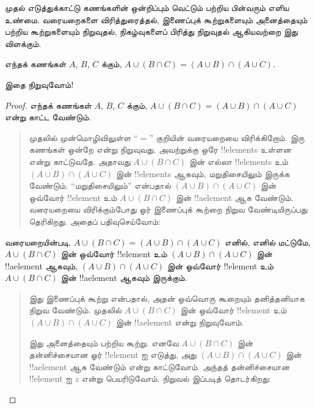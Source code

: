 \documentclass[../../../include/open-logic-section]{subfiles}
\begin{document}


முதல் எடுத்துக்காட்டு கணங்களின் ஒன்றிப்பும் வெட்டும் பற்றிய
பின்வரும் எளிய உண்மை. வரையறைகளை விரித்துரைத்தல்,
இணைப்புக் கூற்றுகளையும் அனைத்தையும் பற்றிய கூற்றுகளையும்
நிறுவுதல், நிகழ்வுகளைப் பிரித்து நிறுவுதல் ஆகியவற்றை
இது விளக்கும்.

\begin{prop}
எந்தக் கணங்கள் $A$, $B$, $C$ க்கும்,
$A \cup (B \cap C) = (A \cup B) \cap (A \cup C)$.
\end{prop}

இதை நிறுவுவோம்!{}

\begin{proof}
எந்தக் கணங்கள் $A$, $B$, $C$ க்கும்,
$A \cup (B \cap C) = (A \cup B) \cap (A \cup C)$
என்று காட்ட வேண்டும்.
\begin{quote}
முதலில் முன்மொழிவிலுள்ள ``$=$'' குறியின் வரையறையை
விரிக்கிறோம். இரு கணங்கள் ஒன்றே என்று நிறுவுவது,
அவற்றுக்கு ஒரே !!{element}s உள்ளன என்று காட்டுவதே.
அதாவது $A \cup (B \cap C)$ இன் எல்லா
!!{element}s உம் $(A \cup B) \cap (A \cup C)$
இன் !!{element}s ஆகவும், மறுதிசையிலும் இருக்க வேண்டும்.
``மறுதிசையிலும்'' என்பதால் $(A \cup B) \cap (A \cup C)$
இன் ஒவ்வோர் !!{element} உம் $A \cup (B \cap C)$
இன் !!a{element} ஆக வேண்டும். வரையறையை விரிக்கும்போது
ஓர் இணைப்புக் கூற்றை நிறுவ வேண்டியிருப்பது தெரிகிறது.
அதைப் பதிவுசெய்வோம்:
\end{quote}
வரையறையின்படி, $A \cup (B \cap C) = (A \cup B) \cap (A \cup C)$
எனில், எனில் மட்டுமே, $A \cup (B \cap C)$ இன் ஒவ்வோர்
!!{element} உம் $(A \cup B) \cap (A \cup C)$ இன்
!!a{element} ஆகவும், $(A \cup B) \cap (A \cup C)$
இன் ஒவ்வோர் !!{element} உம் $A \cup (B \cap C)$
இன் !!a{element} ஆகவும் இருக்கும்.
\begin{quote}
இது இணைப்புக் கூற்று என்பதால், அதன் ஒவ்வொரு கூறையும்
தனித்தனியாக நிறுவ வேண்டும். முதலில் $A \cup (B \cap C)$
இன் ஒவ்வோர் !!{element} உம் $(A \cup B) \cap (A \cup C)$
இன் !!a{element} என்று நிறுவுவோம்.

இது அனைத்தையும் பற்றிய கூற்று. எனவே $A \cup (B \cap C)$
இன் தன்னிச்சையான ஓர் !!{element} ஐ எடுத்து, அது
$(A \cup B) \cap (A \cup C)$ இன் !!a{element}
ஆக வேண்டும் என்று காட்டுவோம். அந்தத் தன்னிச்சையான
!!{element} ஐ $z$ என்று பெயரிடுவோம். நிறுவல்
இப்படித் தொடர்கிறது:
\end{quote}


\end{proof}
\end{document}
